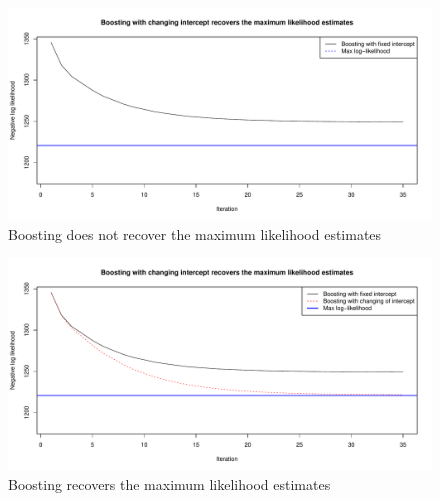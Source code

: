 \begin{figure}\label{fig:boosting-ML-fixed-only}
\caption{Boosting does not recover the maximum likelihood estimates}
\centering\includegraphics[scale=0.4]{figures/case1_fixed_only.pdf}
\end{figure}

\begin{figure}\label{fig:boosting-ML}
\caption{Boosting recovers the maximum likelihood estimates}
\centering\includegraphics[scale=0.4]{figures/small_example.pdf}
\end{figure}